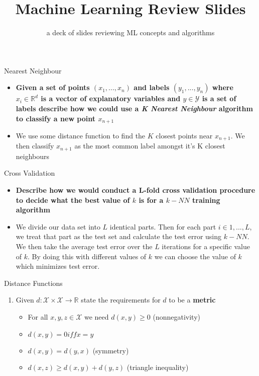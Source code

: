 \documentclass{beamer}
\title[ML Review Slides]{Machine Learning Review Slides}
\subtitle{a deck of slides reviewing ML concepts and algorithms}
\author[]{}
\date{}
\begin{document}
\maketitle%
\begin{frame}{Nearest Neighbour}
    \begin{itemize}
        \item<1->\textbf{Given a set of points $(x_1, ..., x_n)$ and labels $(y_1, ..., y_n)$ where $x_i \in \mathbb{R}^d$ is a vector of explanatory variables and $y \in \mathcal{Y}$ is a set of labels describe how we could use a \textit{K Nearest Neighbour} algorithm to classify a new point $x_{n+1}$ }
        \item<2->We use some distance function to find the $K$ closest points near $x_{n+1}$. We then classify $x_{n+1}$ as the most common label amongst it's K closest neighbours
    \end{itemize}
\end{frame}
%
\begin{frame}{Cross Validation}
    \begin{itemize}
        \item<1->\textbf{Describe how we would conduct a L-fold cross validation procedure to decide what the best value of $k$ is for a $k-NN$ training algorithm}
        \item<2-> We divide our data set into $L$ identical parts. Then for each part $i \in {1,...,L}$, we treat that part as the test set and calculate the test error using $k-NN$. We then take the average test error over the $L$ iterations for a specific value of $k$. By doing this with different values of $k$ we can choose the value of $k$ which minimizes test error.  
    \end{itemize}
\end{frame}
%
\begin{frame}{Distance Functions}
    \begin{enumerate}
        \item<1-> Given $d: \mathcal{X} \times \mathcal{X} \rightarrow \mathbb{R}$ state the requirements for $d$ to be a \textbf{metric} \begin{itemize}
            \item<2-> For all $x,y,z \in \mathcal{X}$ we need $d(x,y) \geq 0$ (nonnegativity)
            \item<2->$d(x,y) = 0 iff x=y$
            \item<2->$d(x,y) = d(y,x)$ (symmetry)
            \item<2->$d(x,z) \geq d(x,y) + d(y,z)$ (triangle inequality)
        \end{itemize}
    \end{enumerate}
\end{frame}
\end{document}
